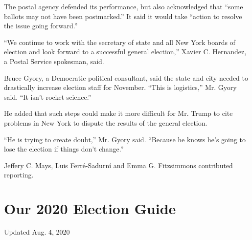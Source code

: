 The postal agency defended its performance, but also acknowledged that
``some ballots may not have been postmarked.'' It said it would take
``action to resolve the issue going forward.''

``We continue to work with the secretary of state and all New York
boards of election and look forward to a successful general election,''
Xavier C. Hernandez, a Postal Service spokesman, said.

Bruce Gyory, a Democratic political consultant, said the state and city
needed to drastically increase election staff for November. ``This is
logistics,'' Mr. Gyory said. ``It isn't rocket science.''

He added that such steps could make it more difficult for Mr. Trump to
cite problems in New York to dispute the results of the general
election.

``He is trying to create doubt,'' Mr. Gyory said. ``Because he knows
he's going to lose the election if things don't change.''

Jeffery C. Mays, Luis Ferré-Sadurní and Emma G. Fitzsimmons contributed
reporting.

\hypertarget{our-2020-election-guide}{%
\section{Our 2020 Election Guide}\label{our-2020-election-guide}}

Updated Aug. 4, 2020

